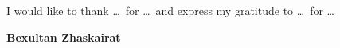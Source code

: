 \pagestyle{empty}
\par
\vspace{0.5cm}

\noindent
I would like to thank \dots\ for \dots\ and express my gratitude to \dots\ for \dots

\vspace{1cm}
\begin{flushright}
\textbf{Bexultan Zhaskairat}
\end{flushright}
